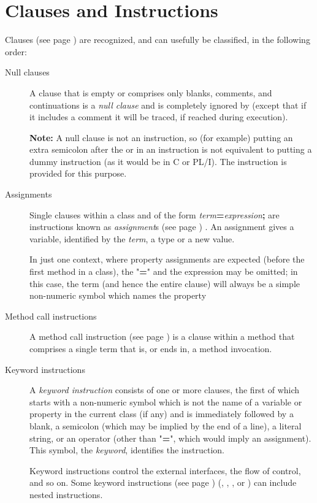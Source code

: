 \section{Clauses and Instructions}\label{refclause}
  Clauses (see page \pageref{refclau})  are recognized, and can usefully be
classified, in the following order:
\begin{description}
\item[Null clauses]\label{refnullcl}

A clause that is empty or comprises only blanks, comments, and
continuations is a \emph{null clause} and is completely ignored by
\nr{} (except that if it includes a comment it will be traced, if
reached during execution).
\begin{shaded}
\textbf{Note: }A null clause is not an instruction, so (for example) putting an
extra semicolon after the  or  in an
 instruction is not equivalent to putting a dummy instruction
(as it would be in C or PL/I).
The  instruction is provided for this purpose.
\end{shaded}
\item[Assignments]

Single clauses within a class and of the form
\emph{term}\textbf{=}\emph{expression}\textbf{;} are
instructions known as  \emph{assignment}s (see page \pageref{refassign}) .
An assignment gives a variable, identified by the
\emph{term}, a type or a new value.
 
In just one context, where property assignments are expected (before the
first method in a class), the "\textbf{=}" and the expression may
be omitted; in this case, the term (and hence the entire clause) will
always be a simple non-numeric symbol which names the property
\item[Method call instructions]\label{refxmeth}

A  method call instruction (see page \pageref{refmcalli})  is a clause within a
method that comprises a single term that is, or ends in, a method
invocation.
\item[Keyword instructions]\label{refkwcl}

A \emph{keyword instruction} consists of one or more clauses,
the first of which starts with a non-numeric symbol which is not the
name of a variable or property in the current class (if any) and is
immediately followed by a blank, a semicolon (which may be implied by
the end of a line), a literal string, or an operator (other than
"\textbf{=}", which would imply an assignment).
This symbol, the \emph{keyword}, identifies the instruction.
 
Keyword instructions control the external interfaces, the flow of
control, and so on.
Some  keyword instructions (see page \pageref{refkinst})  (, ,
, or ) can include nested instructions.
\end{description}
